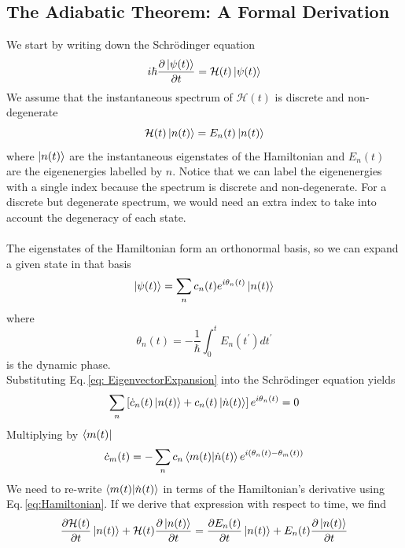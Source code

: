 \subsection{The Adiabatic Theorem: A Formal Derivation}
We start by writing down the Schrödinger equation
\begin{equation}
    i\hbar \frac{\partial \ket{\psi(t)}}{\partial t} = \mathcal{H}(t)\ket{\psi(t)}
\end{equation}
We assume that the instantaneous spectrum of $\mathcal{H}(t)$ is discrete and non-degenerate
\begin{equation}
\label{eq:Hamiltonian}
    \mathcal{H}(t) \ket{n(t)} = E_{n}(t)\ket{n(t)}
\end{equation}
where $\ket{n(t)}$ are the instantaneous eigenstates of the Hamiltonian and $E_{n}(t)$ are the eigenenergies labelled by $n$. Notice that we can label the eigenenergies with a single index because the spectrum is discrete and non-degenerate. For a discrete but degenerate spectrum, we would need an extra index to take into account the degeneracy of each state.\\\\
The eigenstates of the Hamiltonian form an orthonormal basis, so we can expand a given state in that basis
\begin{equation}
\label{eq: EigenvectorExpansion}
    \ket{\psi(t)} = \sum_{n}c_{n}(t)e^{i\theta_{n}(t)} \ket{n(t)}
\end{equation}
where
\begin{equation}
    \theta_{n}(t) = -\frac{1}{\hbar}\int_{0}^{t}E_{n}(t^{\prime})dt^{\prime}
\end{equation}
is the dynamic phase.\\
Substituting Eq.\,\eqref{eq: EigenvectorExpansion} into the Schrödinger equation yields
\begin{equation}
    \sum_{n}\left[\dot{c}_{n}(t)\ket{n(t)} + c_{n}(t)\ket{\dot{n}(t)}\right]e^{i\theta_{n}(t)} = 0
\end{equation}
Multiplying by $\bra{m(t)}$
\begin{equation}
\label{eq:Coefficients}
    \dot{c}_{m}(t) = - \sum_{n}c_{n}\braket{m(t)|\dot{n}(t)}e^{i\left(\theta_{n}(t) - \theta_{m}(t)\right)}
\end{equation}
We need to re-write $\braket{m(t)|\dot{n}(t)}$ in terms of the Hamiltonian's derivative using Eq.\,\eqref{eq:Hamiltonian}. If we derive that expression with respect to time, we find
\begin{equation}
    \frac{\partial \mathcal{H}(t)}{\partial t}\ket{n(t)} + \mathcal{H}(t)\frac{\partial \ket{n(t)}}{\partial t} = \frac{\partial E_{n}(t)}{\partial t} \ket{n(t)} + E_{n}(t)\frac{\partial \ket{n(t)}}{\partial t} 
\end{equation}
